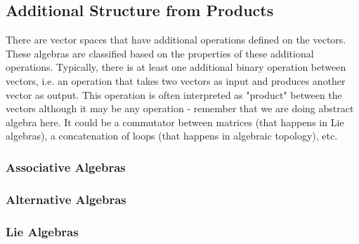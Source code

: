


\subsection{Additional Structure from Products} 
There are vector spaces that have additional operations defined on the vectors. These algebras are classified based on the properties of these additional operations. Typically, there is at least one additional binary operation between vectors, i.e. an operation that takes two vectors as input and produces another vector as output. This operation is often interpreted as "product" between the vectors although it may be any operation - remember that we are doing abstract algebra here. It could be a commutator between matrices (that happens in Lie algebras), a concatenation of loops (that happens in algebraic topology), etc.



\subsubsection{Associative Algebras} 

\subsubsection{Alternative Algebras} 

\subsubsection{Lie Algebras} 



